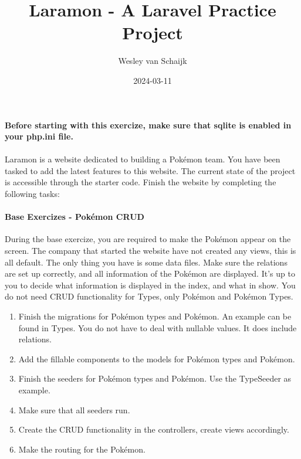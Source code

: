 \documentclass{article}
\title{Laramon - A Laravel Practice Project}
\author{Wesley van Schaijk}
\date{2024-03-11}
\begin{document}
\maketitle

\paragraph{}
\textbf{Before starting with this exercize, 
make sure that sqlite is enabled in your php.ini file.}

\paragraph{}
Laramon is a website dedicated to building a Pokémon team.
You have been tasked to add the latest features to this website.
The current state of the project is accessible through the starter code.
Finish the website by completing the following tasks:

\paragraph{Base Exercizes - Pokémon CRUD}
During the base exercize, you are required to make the Pokémon appear on the screen.
The company that started the website have not created any views, this is all default.
The only thing you have is some data files.
Make sure the relations are set up correctly, and all information of the Pokémon are displayed.
It's up to you to decide what information is displayed in the index, and what in show.
You do not need CRUD functionality for Types, only Pokémon and Pokémon Types.

\begin{enumerate}
	\item Finish the migrations for Pokémon types and Pokémon. 
          An example can be found in Types. You do not have to deal with nullable values.
          It does include relations.
    \item Add the fillable components to the models for Pokémon types and Pokémon.
    \item Finish the seeders for Pokémon types and Pokémon. Use the TypeSeeder as example.
    \item Make sure that all seeders run.
    \item Create the CRUD functionality in the controllers, create views accordingly.
    \item Make the routing for the Pokémon.
\end{enumerate}
\end{document}

